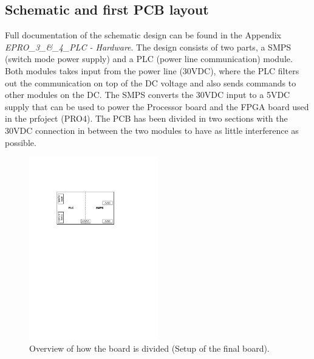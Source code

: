 \subsection{Schematic and first PCB layout}
Full documentation of the schematic design can be found in the Appendix \textit{EPRO\_3\_\&\_4\_PLC - Hardware}. The design consists of two parts, a SMPS (switch mode power supply) and a PLC (power line communication) module. Both modules takes input from the power line (30VDC), where the PLC filters out the communication on top of the DC voltage and also sends commands to other modules on the DC. The SMPS converts the 30VDC input to a 5VDC supply that can be used to power the Processor board and the FPGA board used in the prfoject (PRO4). The PCB has been divided in two sections with the 30VDC connection in between the two modules to have as little interference as possible.
\begin{figure}[H]
	\begin{centering}
		 \includegraphics[width=0.5\textwidth]{images/pcb_design.pdf}
		\caption{Overview of how the board is divided (Setup of the final board).}
		\label{fig:board_overview}
	\end{centering}
\end{figure}

